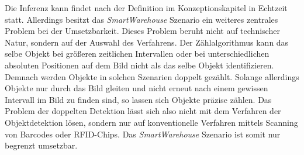 Die Inferenz kann findet nach der Definition im Konzeptionskapitel in Echtzeit statt. Allerdings besitzt das \textit{SmartWarehouse} Szenario ein weiteres zentrales Problem bei der Umsetzbarkeit. Dieses Problem beruht nicht auf technischer Natur, sondern auf der Auswahl des Verfahrens. Der Zählalgorithmus kann das selbe Objekt bei größeren zeitlichen Intervallen oder bei unterschiedlichen absoluten Positionen auf dem Bild nicht als das selbe Objekt identifizieren. Demnach werden Objekte in solchen Szenarien doppelt gezählt. Solange allerdings Objekte nur durch das Bild \glqq gleiten\grqq{} und nicht erneut nach einem gewissen Intervall im Bild zu finden sind, so lassen sich Objekte präzise zählen. Das Problem der doppelten Detektion lässt sich also nicht mit dem Verfahren der Objektdetektion lösen, sondern nur auf konventionelle Verfahren mittels Scanning von Barcodes oder RFID-Chips. Das \textit{SmartWarehouse} Szenario ist somit nur begrenzt umsetzbar. 


